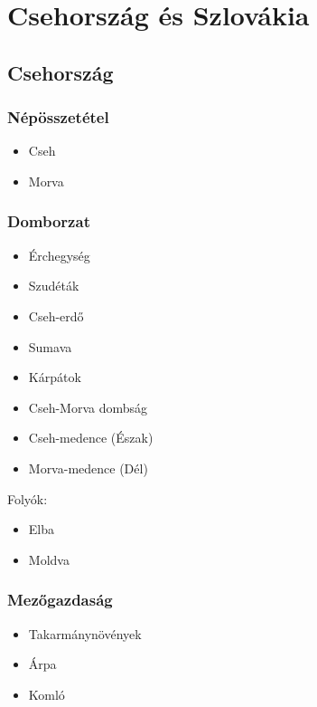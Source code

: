 \documentclass{article}
\begin{document}
\section{Csehország és Szlovákia}

\subsection{Csehország}
\subsubsection{Népösszetétel}
\begin{itemize}
    \item Cseh
    \item Morva
\end{itemize}

\subsubsection{Domborzat}
\begin{itemize}
    \item Érchegység
    \item Szudéták
    \item Cseh-erdő
    \item Sumava
    \item Kárpátok
    \item Cseh-Morva dombság
    \item Cseh-medence (Észak)
    \item Morva-medence (Dél)
\end{itemize}

Folyók:
\begin{itemize}
    \item Elba
    \item Moldva
\end{itemize}

\subsubsection{Mezőgazdaság}
\begin{itemize}
    \item Takarmánynövények
    \item Árpa
    \item Komló
\end{itemize}
\end{document}
